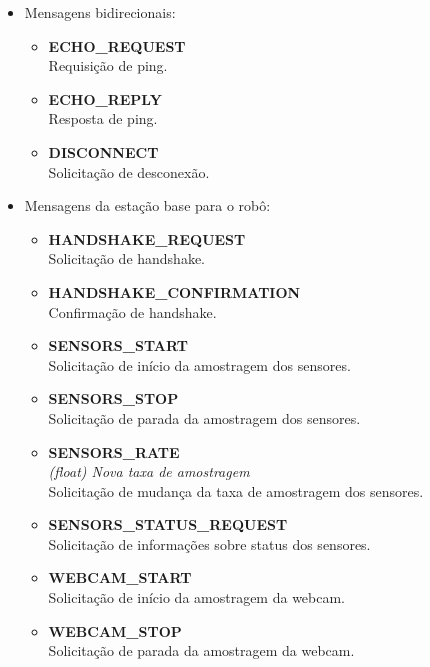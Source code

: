 \begin{itemize}
  \item Mensagens bidirecionais:

    \begin{itemize}
      \item \textbf{ECHO\_REQUEST}\\
	Requisição de ping.
      \item \textbf{ECHO\_REPLY}\\
	Resposta de ping.
      \item \textbf{DISCONNECT} \\
	Solicitação de desconexão.
    \end{itemize}

  \item Mensagens da estação base para o robô:

    \begin{itemize}
      \item \textbf{HANDSHAKE\_REQUEST}\\
	Solicitação de handshake.

      \item \textbf{HANDSHAKE\_CONFIRMATION}\\
	Confirmação de handshake.

      \item \textbf{SENSORS\_START}\\
	Solicitação de início da amostragem dos sensores.

      \item \textbf{SENSORS\_STOP}\\
	Solicitação de parada da amostragem dos sensores.

      \item \textbf{SENSORS\_RATE} \\
	\textit{(float) Nova taxa de amostragem}\\
	Solicitação de mudança da taxa de amostragem dos sensores.

      \item \textbf{SENSORS\_STATUS\_REQUEST}\\
	Solicitação de informações sobre status dos sensores.

      \item \textbf{WEBCAM\_START}\\
	Solicitação de início da amostragem da webcam.

      \item \textbf{WEBCAM\_STOP}\\
	Solicitação de parada da amostragem da webcam.


\end{itemize}
\end{itemize}
